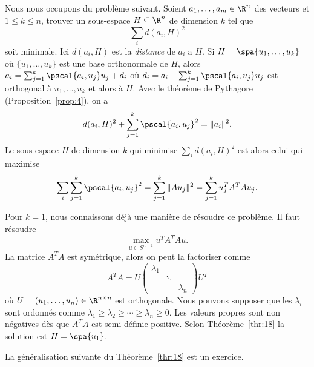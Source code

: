 Nous nous occupons du problème suivant. Soient $a_1,\dots,a_m \in \R^n$ des vecteurs et $1 \leq k \leq n$, trouver un sous-espace $H \subseteq \R^n$ de dimension $k$ tel que 
\begin{displaymath}
  \sum_i d(a_i,H)^2 
\end{displaymath}
soit minimale. Ici $d(a_i,H)$ est la \emph{distance} de $a_i$ a $H$. Si $H = \spa\{u_1,\dots,u_k\}$ où $\{u_1,\dots,u_k\}$  est une base orthonormale de $H$, alors $a_i = \sum_{j=1}^k \pscal{a_i,u_j} u_j + d_i$ où $d_i = a_i - \sum_{j=1}^k \pscal{a_i,u_j} u_j$ est orthogonal à $u_1,\dots,u_k$ et alors à $H$.  Avec le théorème de Pythagore (Proposition~\ref{prop:4}), on a
\begin{displaymath}
  d(a_i,H)^2 + \sum_{j=1}^k \pscal{a_i,u_j}^2 = \|a_i\|^2. 
\end{displaymath}
Le sous-espace $H$ de dimension $k$ qui minimise $\sum_i d(a_i,H)^2$ est alors celui qui maximise 
\begin{displaymath}
\sum_i  \sum_{j=1}^k \pscal{a_i,u_j}^2 = \sum_{j=1}^k \|A u_j\|^2 = \sum_{j=1}^k u_j^T A^TAu_j.
\end{displaymath}

Pour $k=1$, nous connaissons déjà une manière de résoudre ce problème. Il faut résoudre 
\begin{displaymath}
\max_{u \in S^{n-1}}   u^TA^TAu .
\end{displaymath}
La matrice $A^TA$ est symétrique, alors on peut la factoriser comme 
\begin{equation}
  \label{eq:17}
  A^TA = U
  \begin{pmatrix}
    \lambda_1 \\
    & \ddots \\
    & & \lambda_n
  \end{pmatrix} U^T
\end{equation}
où $U = \left(u_1,\dots,u_n\right) \in \R^{n \times n}$ est orthogonale. Nous pouvons supposer que les $\lambda_i$ sont ordonnés comme $\lambda_1 \geq \lambda_2 \geq \cdots \geq \lambda_n \geq 0$. Les valeurs propres sont non négatives dès que $A^TA$ est semi-définie positive. Selon Théorème~\ref{thr:18} la solution est $H = \spa\{u_1\}$. 

\medskip 
La généralisation suivante du Théorème~\ref{thr:18} est un exercice. 

